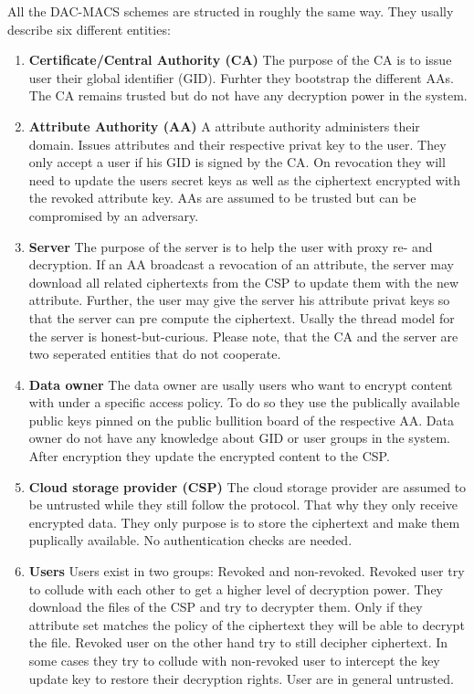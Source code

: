 All the \ac{DAC-MACS} schemes are structed in roughly the same way. They usally describe six different entities:

\begin{enumerate}
	\item \textbf{Certificate/Central Authority (\ac{CA})} The purpose of the \ac{CA} is to issue user their global identifier (\ac{GID}). Furhter they bootstrap the different \ac{AA}s. The \ac{CA} remains trusted but do not have any decryption power in the system. 
	\item \textbf{Attribute Authority (\ac{AA})} A attribute authority administers their domain. Issues attributes and their respective privat key to the user. They only accept a user if his \ac{GID} is signed by the \ac{CA}. 
	On revocation they will need to update the users secret keys as well as the ciphertext encrypted with the revoked attribute key. \ac{AA}s are assumed to be trusted but can be compromised by an adversary.
	\item \textbf{Server} The purpose of the server is to help the user with proxy re- and decryption. If an \ac{AA} broadcast a revocation of an attribute, the server may download all related ciphertexts from the \ac{CSP} to update them with the new attribute. 
	Further, the user may give the server his attribute privat keys so that the server can pre compute the ciphertext. Usally the thread model for the server is honest-but-curious. Please note, that the \ac{CA} and the server are two seperated entities that do not cooperate.
	\item \textbf{Data owner} The data owner are usally users who want to encrypt content with under a specific access policy. To do so they use the publically available public keys pinned on the public bullition board of the respective \ac{AA}. Data owner do not have any knowledge about \ac{GID} or user groups in the system. After encryption they update the encrypted content to the \ac{CSP}.
	\item \textbf{Cloud storage provider (\ac{CSP})} The cloud storage provider are assumed to be untrusted while they still follow the protocol. That why they only receive encrypted data. They only purpose is to store the ciphertext and make them puplically available. No authentication checks are needed.
	\item \textbf{Users} Users exist in two groups: Revoked and non-revoked. Revoked user try to collude with each other to get a higher level of decryption power. They download the files of the \ac{CSP} and try to decrypter them. Only if they attribute set matches the policy of the ciphertext they will be able to decrypt the file. 
	Revoked user on the other hand try to still decipher ciphertext. In some cases they try to collude with non-revoked user to intercept the key update key to restore their decryption rights. 
	User are in general untrusted.
\end{enumerate} 

